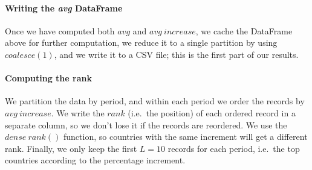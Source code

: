 \paragraph{Writing the \emph{avg} DataFrame}
Once we have computed both $avg$ and $avg~increase$, we cache the DataFrame above for further computation, we reduce it to a single partition by using $coalesce(1)$, and we write it to a CSV file; this is the first part of our results.


\paragraph{Computing the rank}
We partition the data by period, and within each period we order the records by $avg~increase$.
We write the $rank$ (i.e.\ the position) of each ordered record in a separate column, so we don't lose it if the records are reordered.
We use the \href{https://spark.apache.org/docs/latest/sql-ref-functions-builtin.html#window-functions}{$dense~rank()$} function, so countries with the same increment will get a different rank.
Finally, we only keep the first $L = 10$ records for each period, i.e.\ the top countries according to the percentage increment.

